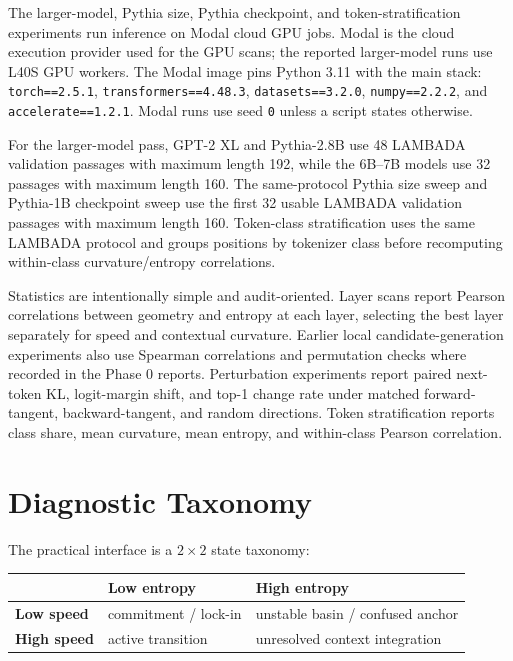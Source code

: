 \documentclass[11pt,letterpaper]{article}
\begin{document}
The larger-model, Pythia size, Pythia checkpoint, and
token-stratification experiments run inference on Modal cloud GPU jobs.
Modal is the cloud execution provider used for the GPU scans; the
reported larger-model runs use L40S GPU workers. The Modal image pins
Python 3.11 with the main stack: \texttt{torch==2.5.1},
\texttt{transformers==4.48.3}, \texttt{datasets==3.2.0},
\texttt{numpy==2.2.2}, and \texttt{accelerate==1.2.1}. Modal runs use
seed \texttt{0} unless a script states otherwise.

For the larger-model pass, GPT-2 XL and Pythia-2.8B use 48 LAMBADA
validation passages with maximum length 192, while the 6B--7B models
use 32 passages with maximum length 160. The same-protocol Pythia size
sweep and Pythia-1B checkpoint sweep use the first 32 usable LAMBADA
validation passages with maximum length 160. Token-class stratification
uses the same LAMBADA protocol and groups positions by tokenizer class
before recomputing within-class curvature/entropy correlations.

Statistics are intentionally simple and audit-oriented. Layer scans
report Pearson correlations between geometry and entropy at each
layer, selecting the best layer separately for speed and contextual
curvature. Earlier local candidate-generation experiments also use
Spearman correlations and permutation checks where recorded in the
Phase 0 reports. Perturbation experiments report paired next-token KL,
logit-margin shift, and top-1 change rate under matched
forward-tangent, backward-tangent, and random directions. Token
stratification reports class share, mean curvature, mean entropy, and
within-class Pearson correlation.

\section{Diagnostic Taxonomy}
\label{sec:taxonomy}

The practical interface is a $2 \times 2$ state taxonomy:

\begin{center}
\begin{tabular}{l|ll}
\toprule
 & \textbf{Low entropy} & \textbf{High entropy} \\
\midrule
\textbf{Low speed}  & commitment / lock-in & unstable basin / confused anchor \\
\textbf{High speed} & active transition    & unresolved context integration \\
\bottomrule
\end{tabular}
\end{center}
\end{document}
